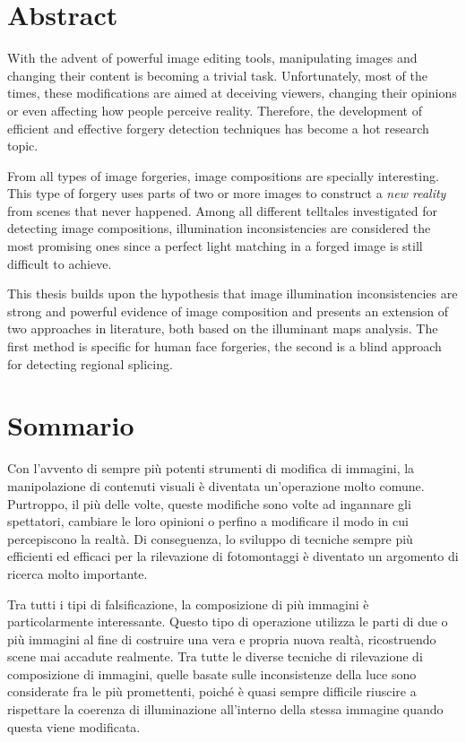 \chapter*{Abstract}

With the advent of powerful image editing tools, manipulating images and changing their content is becoming a trivial task. Unfortunately, most of the times, these modifications are aimed at deceiving viewers, changing their opinions or even affecting how people perceive reality. Therefore, the development of efficient and effective forgery detection techniques has become a hot research topic. 

From all types of image forgeries, image compositions are specially interesting. This type of forgery uses parts of two or more images to construct a \emph{new reality} from scenes that never happened. Among all different telltales investigated for detecting image compositions, illumination inconsistencies are considered the most promising ones since a perfect light matching in a forged image is still difficult to achieve. 

This thesis builds upon the hypothesis that image illumination inconsistencies are strong and powerful evidence of image composition and presents an extension of two approaches in literature, both based on the illuminant maps analysis. The first method is specific for human face forgeries, the second is a blind approach for detecting regional splicing.


\chapter*{Sommario}

Con l'avvento di sempre più potenti strumenti di modifica di immagini, la manipolazione di contenuti visuali è diventata un'operazione molto comune. Purtroppo, il più delle volte, queste modifiche sono volte ad ingannare gli spettatori, cambiare le loro opinioni o perfino a modificare il modo in cui percepiscono la realtà. Di conseguenza, lo sviluppo di tecniche sempre più efficienti ed efficaci per la rilevazione di fotomontaggi  è diventato un argomento di ricerca molto importante. 


Tra tutti i tipi di falsificazione, la composizione di più immagini è particolarmente interessante. Questo tipo di operazione utilizza le parti di due o più immagini al fine di costruire una vera e propria nuova realtà, ricostruendo scene mai accadute realmente. Tra tutte le diverse tecniche di rilevazione di composizione di immagini, quelle basate sulle inconsistenze della luce sono considerate fra le più promettenti, poiché è quasi sempre difficile riuscire a rispettare la coerenza di illuminazione all'interno della stessa immagine quando questa viene modificata.

